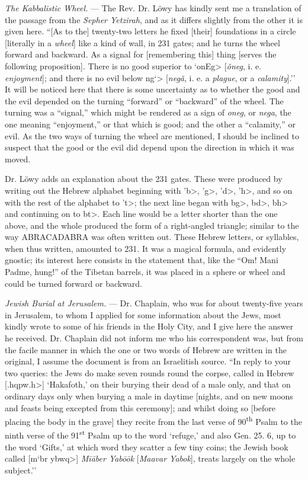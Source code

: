 \documentclass[a4paper, 11pt, oneside, polutonikogreek, english]{article}
\begin{document}
\emph{The Kabbalistic Wheel.} --- The Rev. Dr. Löwy has kindly sent me a translation of the passage from the \emph{Sepher Yetzirah}, and as it differs slightly from the other it is given here. ``[As to the] twenty-two letters he fixed [their] foundations in a circle [literally in a \emph{wheel}] like a kind of wall, in 231 gates; and he turns the wheel forward and backward. As a signal for [remembering this] thing [serves the following proposition]. There is no good superior to \<`onEg> [\emph{ǒneg}, i. e. \emph{enjoyment}]; and there is no evil below \<ng`> [\emph{negǎ}, i. e. a \emph{plague}, or a \emph{calamity}].'' It will be noticed here that there is some uncertainty as to whether the good and the evil depended on the turning ``forward'' or ``backward'' of the wheel. The turning was a ``signal,'' which might be rendered as a sign of \emph{oneg}, or \emph{nega}, the one meaning ``enjoyment,'' or that which is good; and the other a ``calamity,'' or evil. As the two ways of turning the wheel are mentioned, I should be inclined to suspect that the good or the evil did depend upon the direction in which it was moved.

Dr. Löwy adds an explanation about the 231 gates. These were produced by writing out the Hebrew alphabet beginning with \<'b>, \<'g>, \<'d>, \<'h>, and so on with the rest of the alphabet to \<'t>; the next line began with \<bg>, \<bd>, \<bh> and continuing on to \<bt>. Each line would be a letter shorter than the one above, and the whole produced the form of a right-angled triangle; similar to the way ABRACADABRA was often written out. These Hebrew letters, or syllables, when thus written, amounted to 231. It was a magical formula, and evidently gnostic; its interest here consists in the statement that, like the ``Om! Mani Padme, hung!'' of the Tibetan barrels, it was placed in a sphere or wheel and could be turned forward or backward.

\emph{Jewish Burial at Jerusalem.} --- Dr. Chaplain, who was for about twenty-five years in Jerusalem, to whom I applied for some information about the Jews, most kindly wrote to some of his friends in the Holy City, and I give here the answer he received. Dr. Chaplain did not inform me who his correspondent was, but from the facile manner in which the one or two words of Hebrew are written in the original, I assume the document is from an Israelitish source. ``In reply to your two queries: the Jews do make seven rounds round the corpse, called in Hebrew [\<.hqpw.h>] `Hakafoth,' on their burying their dead of a male only, and that on ordinary days only when burying a male in daytime [nights, and on new moons and feasts being excepted from this ceremony]; and whilst doing so [before placing the body in the grave] they recite from the last verse of 90\textsuperscript{th} Psalm to the ninth verse of the 91\textsuperscript{st} Psalm up to the word `refuge,' and also Gen. 25. 6, up to the word `Gifts,' at which word they scatter a few tiny coins; the Jewish book called [\<m`br ybwq>] \emph{Mīāber Yabōōk} [\emph{Maavar Yabok}], treats largely on the whole subject.''
\end{document}
